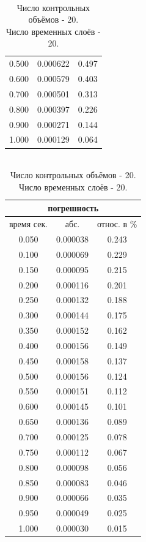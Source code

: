 \documentclass[oneside, final, 14pt]{report}
\begin{document}
\begin{table}[th!]
\begin{minipage}{0.3\textwidth}
\begin{tabular}{|c|c|c|}
0.500 & 0.000622 & 0.497 \\
0.600 & 0.000579 & 0.403 \\
0.700 & 0.000501 & 0.313 \\
0.800 & 0.000397 & 0.226 \\
0.900 & 0.000271 & 0.144 \\
1.000 & 0.000129 & 0.064 \\
\hline
\end{tabular}
\end{minipage}
\hfillx
%
%
\begin{minipage}{0.3\textwidth}
\centering
\caption{\\ Число контрольных объёмов - 20. \\ Число временных слоёв - 20.}
\begin{tabular}{|c|c|c|}
\hline \multicolumn{3}{|c|}{ погрешность} \\
\hline 
время сек. & абс. & относ. в \%
\\
\hline 
0.050 & 0.000038 & 0.243 \\
0.100 & 0.000069 & 0.229 \\
0.150 & 0.000095 & 0.215 \\
0.200 & 0.000116 & 0.201 \\
0.250 & 0.000132 & 0.188 \\
0.300 & 0.000144 & 0.175 \\
0.350 & 0.000152 & 0.162 \\
0.400 & 0.000156 & 0.149 \\
0.450 & 0.000158 & 0.137 \\
0.500 & 0.000156 & 0.124 \\
0.550 & 0.000151 & 0.112 \\
0.600 & 0.000145 & 0.101 \\
0.650 & 0.000136 & 0.089 \\
0.700 & 0.000125 & 0.078 \\
0.750 & 0.000112 & 0.067 \\
0.800 & 0.000098 & 0.056 \\
0.850 & 0.000083 & 0.046 \\
0.900 & 0.000066 & 0.035 \\
0.950 & 0.000049 & 0.025 \\
1.000 & 0.000030 & 0.015 \\
\hline
\end{tabular}
\end{minipage}
\end{table}
\end{document}
